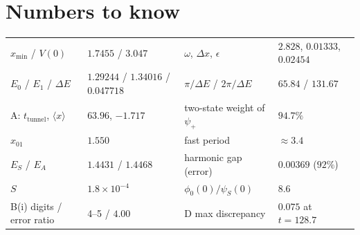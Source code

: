 \documentclass[10pt]{article}
\begin{document}
\section{Numbers to know}
\begin{tabular}{@{}ll@{\qquad}ll@{}}
\toprule
$x_{\min}$ / $V(0)$ & $1.7455$ / $3.047$ & $\omega$, $\Delta x$, $\epsilon$ & $2.828$, $0.01333$, $0.02454$\\
$E_0$ / $E_1$ / $\Delta E$ & $1.29244$ / $1.34016$ / $0.047718$ & $\pi/\Delta E$ / $2\pi/\Delta E$ & $65.84$ / $131.67$\\
A: $t_\text{tunnel}$, $\langle x\rangle$ & $63.96$, $-1.717$ & two-state weight of $\psi_+$ & $94.7\%$\\
$x_{01}$ & $1.550$ & fast period & $\approx3.4$\\
$E_S$ / $E_A$ & $1.4431$ / $1.4468$ & harmonic gap (error) & $0.00369$ ($92\%$)\\
$S$ & $1.8\times10^{-4}$ & $\phi_0(0)/\psi_S(0)$ & $8.6$\\
B(i) digits / error ratio & 4--5 / $4.00$ & D max discrepancy & $0.075$ at $t=128.7$\\
\bottomrule
\end{tabular}
\end{document}
